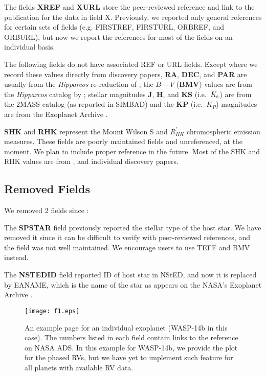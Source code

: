 \documentclass[11pt,preprint]{aastex}
\begin{document}
\begin{CJK*}{UTF8}{gbsn}
The fields {\bf XREF} and {\bf XURL} store the peer-reviewed reference
and link to the publication for the data in field X. Previously, we 
reported only general references for certain sets of fields (e.g. FIRSTREF,
FIRSTURL, ORBREF, and ORBURL), but now we report the references for
most of the fields on an individual basis.

The following fields do not have associated REF or URL fields. Except
where we record these values directly from discovery papers, {\bf RA},
{\bf DEC}, and {\bf PAR} are usually from the \textit{Hipparcos}
re-reduction of \cite{van Leeuwen2009}; the $B-V$ ({\bf BMV}) values
are from the \textit{Hipparcos} catalog by \cite{Perryman1997};
stellar magnitudes {\bf J}, {\bf H}, and {\bf KS} (i.e.\ $K_{\rm s}$)
are from the 2MASS catalog \citep{Skrutskie2006} (as reported in
SIMBAD) and the {\bf KP} (i.e.\ $K_P$) magnitudes are from the
Exoplanet Archive \citep{Akeson2013}.

{\bf SHK} and {\bf RHK} represent the Mount Wilson S and
$R^\prime_{HK}$ chromospheric
emission measures.  These fields are poorly maintained fields and
unreferenced, at the moment. We plan to include proper reference in
the future. Most of the SHK and RHK values are from \cite{Butler2006},
and individual discovery papers. 

\subsection{Removed Fields}\label{sec:removed}

We removed 2 fields since \cite{Wright2011}:

The {\bf SPSTAR} field previously reported the stellar type of the host
star.  We have removed it since it can be difficult to verify with
peer-reviewed references, and the field was not well maintained.  We encourage users
to use TEFF and BMV instead.

The {\bf NSTEDID} field reported ID of host star in NStED, and now it is
replaced by EANAME, which is the name of the star as appears on the
NASA's Exoplanet Archive \citep{Akeson2013}. 


\begin{figure}[!htb]
\centering
\texttt{[image: f1.eps]}
\caption{An example page for an individual exoplanet (WASP-14b in this
  case). The numbers listed in each field contain links to the
  reference on NASA ADS. In this example for WASP-14b, we provide the plot
  for the phased RVs, but we have yet to implement such feature for all
  planets with available RV data.}
\label{fig:individual}
\end{figure}



\end{CJK*}
\end{document}
